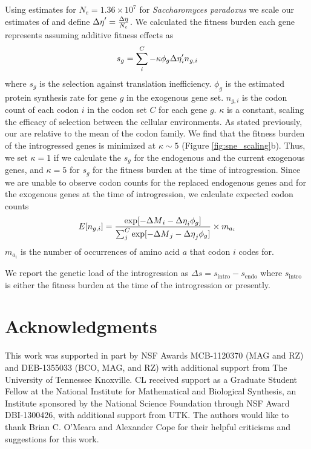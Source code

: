 Using estimates for $N_e = 1.36\times10^7$ \citep{wagner2005} for \textit{Saccharomyces paradoxus} we scale our estimates of \DE and define ${\Delta \eta}' = \frac{{\Delta \eta}}{N_e}$.
We calculated the fitness burden each gene represents assuming additive fitness effects as 
\begin{equation}
s_g = \sum_i^{C} -\kappa \phi_g {\Delta \eta}'_i n_{g,i} 
\end{equation}
where $s_g$ is the selection against translation inefficiency.
$\phi_g$ is the estimated protein synthesis rate for gene $g$ in the exogenous gene set.
$n_{g,i}$ is the codon count of each codon $i$ in the codon set $C$ for each gene $g$.
$\kappa$ is a constant, scaling the efficacy of selection between the cellular environments.
As stated previously, our \DE are relative to the mean of the codon family.
We find that the fitness burden of the introgressed genes  is minimized at $\kappa \sim 5$ (Figure \ref{fig:sne_scaling}b).
Thus, we set $\kappa = 1$ if we calculate the $s_g$ for the endogenous and the current exogenous genes, and $\kappa = 5$ for $s_g$ for the fitness burden at the time of introgression.
Since we are unable to observe codon counts for the replaced endogenous genes and for the exogenous genes at the time of introgression, we calculate expected codon counts
\begin{equation}
E[n_{g,i}] = \frac{\exp[-{\Delta M}_i -{\Delta \eta}_i\phi_g]}{\sum_j^C \exp[-{\Delta M}_j -{\Delta \eta}_j\phi_g]}\times m_{a_i}
\end{equation} 
$m_{a_i}$ is the number of occurrences of amino acid $a$ that codon $i$ codes for.

We report the genetic load of the introgression as $\Delta s = s_\text{intro} - s_\text{endo}$ where $s_\text{intro}$ is either the fitness burden at the time of the introgression or presently.

\section{Acknowledgments}

This work was supported in part by NSF Awards MCB-1120370 (MAG and RZ) and DEB-1355033 (BCO, MAG, and RZ) with additional support from The University of Tennessee Knoxville. 
CL received support as a Graduate Student Fellow at the National Institute for Mathematical and Biological Synthesis, an Institute sponsored by the National Science Foundation through NSF Award DBI-1300426, with additional support from UTK. 
The authors would like to thank Brian C. O'Meara and Alexander Cope for their helpful criticisms and suggestions for this work.


